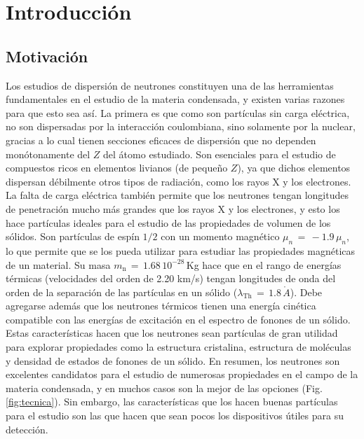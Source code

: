 \chapter{Introducci\'on}
\graphicspath{{./figs/intro/}}
\section{Motivación}\label{S:motivacion}
Los estudios de dispersión de neutrones constituyen una de las herramientas fundamentales en el estudio de la materia condensada\cite{squires}, y existen varias razones para que esto sea así. La primera es que como son partículas sin carga eléctrica, no son dispersadas por la interacción coulombiana, sino solamente por la nuclear, gracias a lo cual tienen secciones eficaces de dispersión que no dependen monótonamente del $Z$ del átomo estudiado\cite{secceff}. Son esenciales para el estudio de compuestos ricos en elementos livianos (de pequeño $Z$), ya que dichos elementos dispersan débilmente otros tipos de radiación, como los rayos X y los electrones. La falta de carga eléctrica también permite que los neutrones tengan longitudes de penetración mucho más grandes que los rayos X y los electrones, y esto los hace partículas ideales para el estudio de las propiedades de volumen de los sólidos\cite{squires}. Son partículas de espín $1/2$ con un momento magnético $\mu_n \, = \, -1.9\,\mu_n$, lo que permite que se los pueda utilizar para estudiar las propiedades magnéticas de un material\cite{squires}. Su masa $m_{\text{n}} \, = \, 1.68 \, 10^{-28}$\,Kg hace que en el rango de energías térmicas (velocidades del orden de 2.20 km/s) tengan longitudes de onda del orden de la separación de las partículas en un sólido ($\lambda_{\text{Th}} \, = \, 1.8\,\mathring{A}$)\cite{squires}. Debe agregarse además que los neutrones térmicos tienen una energía cinética compatible con las e\-ner\-gí\-as de excitación en el espectro de fonones de un sólido\cite{squires}. Estas características hacen que los neutrones sean partículas de gran utilidad para explorar propiedades como la estructura cristalina, estructura de moléculas y densidad de estados de fonones de un sólido. En resumen, los neutrones son excelentes candidatos para el estudio de numerosas propiedades en el campo de la materia condensada, y en muchos casos son la mejor de las opciones (Fig.\,\ref{fig:tecnica}). Sin embargo, las características que los hacen buenas partículas para el estudio son las que hacen que sean pocos los dispositivos útiles para su detección. 
